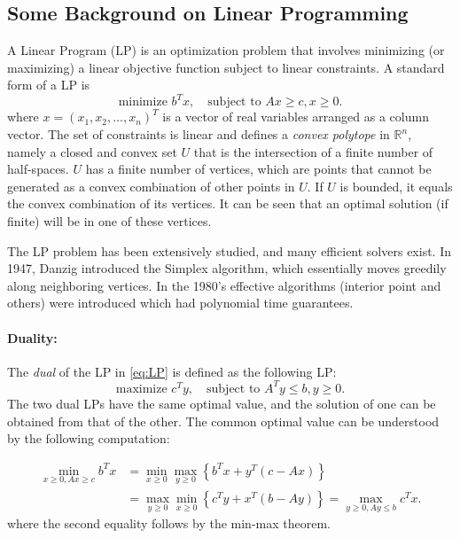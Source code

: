 \subsection{Some Background on Linear Programming}
A Linear Program (LP) is an optimization problem that involves minimizing (or maximizing) a linear objective function subject to linear constraints. A standard form of a LP is
\begin{equation}\label{eq:LP}
 \textrm{minimize } {b^T}x,   \quad \textrm{subject to } Ax \ge c,  x \ge 0.
\end{equation}
where $x = {({x_1},{x_2}, \ldots ,{x_n})^T}$ is a vector of real variables arranged as a column vector.
The set of constraints is linear and defines a \emph{convex polytope} in $\mathbb R^n$, namely a closed and convex set $U$ that is the intersection of a finite number of half-spaces. $U$ has a finite number of vertices, which are points that cannot be generated as a convex combination of other points in  $U$. If  $U$ is bounded, it equals the convex combination of its vertices. It can be seen that an optimal solution (if finite) will be in one of these vertices.

The LP problem has been extensively studied, and many efficient solvers exist. In 1947, Danzig introduced the Simplex algorithm, which essentially moves greedily along neighboring vertices.  In the 1980's effective algorithms (interior point and others) were introduced which had polynomial time guarantees.

\paragraph{Duality:} The \emph{dual} of the LP in \eqref{eq:LP} is defined as the following LP:
\begin{equation}\label{eq:LP_dual}
\textrm{maximize } {c^T}y,   \quad \textrm{subject to } {A^T}y \le b,  y \ge 0.
\end{equation}
The two dual LPs have the same optimal value, and the solution of one can be obtained from that of the other. The common optimal value can be understood by the following computation:

\begin{align*}
\mathop {\min }\limits_{x \ge 0,Ax \ge c} {b^T}x &= \mathop {\min }\limits_{x \ge 0} \mathop {\max }\limits_{y \ge 0} \left\{ {{b^T}x + {y^T}(c - Ax)} \right\}\\
 &= \mathop {\max }\limits_{y \ge 0} \mathop {\min }\limits_{x \ge 0} \left\{ {{c^T}y + {x^T}(b - Ay)} \right\} = \mathop {\max }\limits_{y \ge 0,Ay \le b} {c^T}x.
\end{align*}
where the second equality follows by the min-max theorem.

